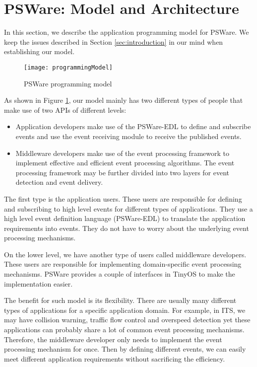 \section{PSWare: Model and Architecture}
\label{sec:model}
In this section, we describe the application programming model for PSWare. We keep the issues described in Section \ref{sec:introduction} in our mind when establishing our model.

\begin{figure}
\centering
\texttt{[image: programmingModel]}
\caption{PSWare programming model}
\label{fig:programmingModel}
\end{figure}

As shown in Figure \ref{fig:programmingModel}, our model mainly has two different types of people that make use of two APIs of different levels:
\begin{itemize}
\item Application developers make use of the PSWare-EDL to define and subscribe events and use the event receiving module to receive the published events.
\item Middleware developers make use of the event processing framework to implement effective and efficient event processing algorithms. The event processing framework may be further divided into two layers for event detection and event delivery.
\end{itemize}

The first type is the application users. These users are responsible for defining and subscribing to high level events for different types of applications. They use a high level event definition language (PSWare-EDL) to translate the application requirements into events. They do not have to worry about the underlying event processing mechanisms.

On the lower level, we have another type of users called middleware developers. These users are responsible for implementing domain-specific event processing mechanisms. PSWare provides a couple of interfaces in TinyOS to make the implementation easier.

The benefit for such model is its flexibility. There are usually many different types of applications for a specific application domain. For example, in ITS, we may have collision warning, traffic flow control and overspeed detection yet these applications can probably share a lot of common event processing mechanisms. Therefore, the middleware developer only needs to implement the event processing mechanism for once. Then by defining different events, we can easily meet different application requirements without sacrificing the efficiency.

